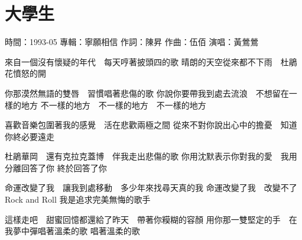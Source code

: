\documentclass[UTF8,a4paper,oneside,twocolumn,12pt]{ctexbook}
\newcommand{\infopair}[2]{\textbullet #1：#2}
\newcommand{\zc}[1][伍佰]{\infopair{作詞}{#1}}
\newcommand{\zq}[1][伍佰]{\infopair{作曲}{#1}}
\newcommand{\zj}[1]{\infopair{專輯}{#1}}
\newcommand{\sj}[1]{\infopair{時間}{#1}}
\newenvironment{info}{\begin{flushleft}\kaishu
	}
	{\end{flushleft}\normalsize\yahei\par}
\newenvironment{lyric}{
	}
{}
\begin{document}
\section{大學生}
\begin{info}
	\sj{1993-05}
	\zj{寧願相信}
	\zc[陳昇]
	\zq
	\infopair{演唱}{黃鶯鶯}
\end{info}
\begin{lyric}
	來自一個沒有懷疑的年代　每天哼著披頭四的歌
	晴朗的天空從來都不下雨　杜鵑花憤怒的開

	你那漠然無語的雙唇　習慣唱著悲傷的歌
	你說你要帶我到處去流浪　不想留在一樣的地方
	不一樣的地方　不一樣的地方　不一樣的地方

	喜歡音樂包圍著我的感覺　活在悲歡兩極之間
	從來不對你說出心中的擔憂　知道你終必要遠走

	杜鵑華岡　還有克拉克蓋博　伴我走出悲傷的歌
	你用沈默表示你對我的愛　我用分離回答了你
	終於回答了你

	命運改變了我　讓我到處移動　多少年來找尋天真的我
	命運改變了我　改變不了Rock and Roll
	我是追求完美無悔的歌手

	這樣走吧　甜蜜回憶都還給了昨天　帶著你糢糊的容顏
	用你那一雙堅定的手　在我夢中彈唱著溫柔的歌
	唱著溫柔的歌
\end{lyric}
\end{document}
